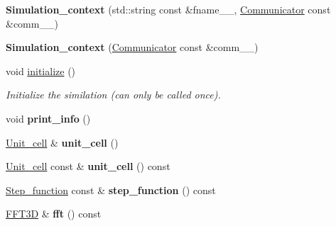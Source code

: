 \begin{DoxyCompactItemize}
\item 
\hypertarget{classsirius_1_1_simulation__context_a87145c36b1d091ead81338afd1790fa8}{}{\bfseries Simulation\+\_\+context} (std\+::string const \&fname\+\_\+\+\_\+, \hyperlink{classsddk_1_1_communicator}{Communicator} const \&comm\+\_\+\+\_\+)\label{classsirius_1_1_simulation__context_a87145c36b1d091ead81338afd1790fa8}

\item 
\hypertarget{classsirius_1_1_simulation__context_a846934eec96d611f5bcf8d4cd2053338}{}{\bfseries Simulation\+\_\+context} (\hyperlink{classsddk_1_1_communicator}{Communicator} const \&comm\+\_\+\+\_\+)\label{classsirius_1_1_simulation__context_a846934eec96d611f5bcf8d4cd2053338}

\item 
void \hyperlink{classsirius_1_1_simulation__context_a74685952fb7ac3d4ec644e41f040945b}{initialize} ()
\begin{DoxyCompactList}\small\item\em Initialize the similation (can only be called once). \end{DoxyCompactList}\item 
\hypertarget{classsirius_1_1_simulation__context_ade1dfea086e74e03304298a4a1944974}{}void {\bfseries print\+\_\+info} ()\label{classsirius_1_1_simulation__context_ade1dfea086e74e03304298a4a1944974}

\item 
\hypertarget{classsirius_1_1_simulation__context_abceb609509e1b82c98d3d86281ee6a13}{}\hyperlink{classsirius_1_1_unit__cell}{Unit\+\_\+cell} \& {\bfseries unit\+\_\+cell} ()\label{classsirius_1_1_simulation__context_abceb609509e1b82c98d3d86281ee6a13}

\item 
\hypertarget{classsirius_1_1_simulation__context_a63dc6470588435cc73a7269ef20d5d91}{}\hyperlink{classsirius_1_1_unit__cell}{Unit\+\_\+cell} const \& {\bfseries unit\+\_\+cell} () const \label{classsirius_1_1_simulation__context_a63dc6470588435cc73a7269ef20d5d91}

\item 
\hypertarget{classsirius_1_1_simulation__context_aacb423b245c3c11644653f4889cf5a5e}{}\hyperlink{classsirius_1_1_step__function}{Step\+\_\+function} const \& {\bfseries step\+\_\+function} () const \label{classsirius_1_1_simulation__context_aacb423b245c3c11644653f4889cf5a5e}

\item 
\hypertarget{classsirius_1_1_simulation__context_aa8f5ffed5ccbeafde7c780aa70dddc90}{}\hyperlink{classsddk_1_1_f_f_t3_d}{F\+F\+T3\+D} \& {\bfseries fft} () const \label{classsirius_1_1_simulation__context_aa8f5ffed5ccbeafde7c780aa70dddc90}


\end{DoxyCompactItemize}
